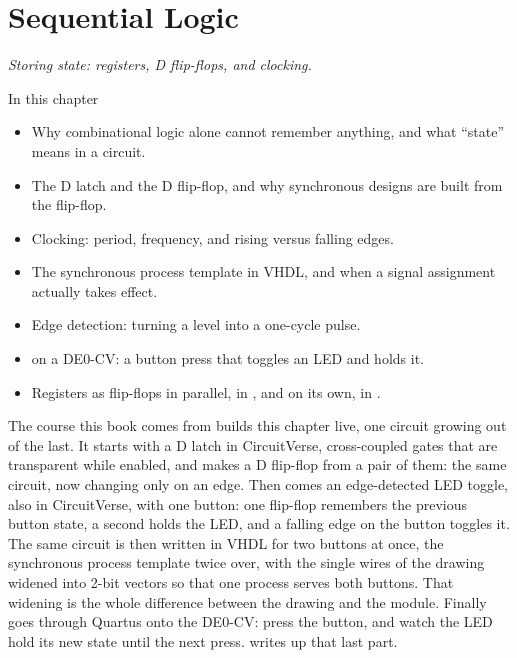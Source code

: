 
\chapter{Sequential Logic}
\label{c3:ch}

{\large\itshape Storing state: registers, D flip-flops, and clocking.\par}

\begin{chapterbox}{In this chapter}
\begin{itemize}
  \item Why combinational logic alone cannot remember anything, and what ``state'' means in a
    circuit.
  \item The D latch and the D flip-flop, and why synchronous designs are built from the flip-flop.
  \item Clocking: period, frequency, and rising versus falling edges.
  \item The synchronous process template in VHDL, and when a signal assignment actually takes
    effect.
  \item Edge detection: turning a level into a one-cycle pulse.
  \item {} on a DE0-CV: a button press that toggles an LED and holds it.
  \item Registers as flip-flops in parallel, in , and  on its own,
    in .
\end{itemize}
\end{chapterbox}

The course this book comes from builds this chapter live, one circuit growing out of the last. It
starts with a D latch in CircuitVerse, cross-coupled gates that are transparent while enabled, and
makes a D flip-flop from a pair of them: the same circuit, now changing only on an edge. Then comes
an edge-detected LED toggle, also in CircuitVerse, with one button: one flip-flop remembers the
previous button state, a second holds the LED, and a falling edge on the button toggles it. The
same circuit is then written in VHDL for two buttons at once, the synchronous process template
twice over, with the single wires of the drawing widened into 2-bit vectors so that one process
serves both buttons. That widening is the whole difference between the drawing and the module.
Finally  goes through Quartus onto the DE0-CV: press the button, and watch the LED
hold its new state until the next press.  writes up that last part.

